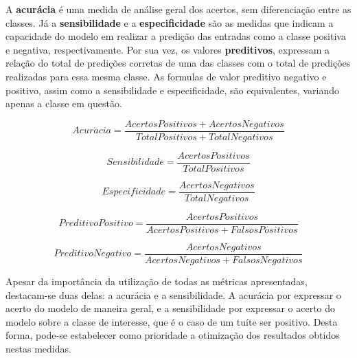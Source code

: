 \documentclass[oneside,openright,12pt]{ufsm_2015} %
\begin{document}
    \par A \textbf{acurácia} é uma medida de análise geral dos acertos, sem diferenciação entre as classes. Já a \textbf{sensibilidade} e a \textbf{especificidade} são as medidas que indicam a capacidade do modelo em realizar a predição das entradas como a classe positiva e negativa, respectivamente. Por sua vez, os valores \textbf{preditivos}, expressam a relação do total de predições corretas de uma das classes com o total de predições realizadas para essa mesma classe. As formulas de valor preditivo negativo e positivo, assim como a sensibilidade e especificidade, são equivalentes, variando apenas a classe em questão.
    
    \begin{equation} \label{eq:acuracidade}
    Acur\acute{a}cia = \frac{AcertosPositivos + AcertosNegativos}{TotalPositivos + TotalNegativos}
    \end{equation}
    
    \begin{equation} \label{eq:sensibilidade}
    Sensibilidade = \frac{AcertosPositivos}{TotalPositivos}
    \end{equation}
    
    \begin{equation} \label{eq:especificidade}
    Especificidade = \frac{AcertosNegativos}{TotalNegativos}
    \end{equation}
    
    \begin{equation} \label{eq:predit-pos}
    PreditivoPositivo = \frac{AcertosPositivos}{AcertosPositivos + FalsosPositivos}
    \end{equation}
    
    \begin{equation} \label{eq:predit-neg}
    PreditivoNegativo = \frac{AcertosNegativos}{AcertosNegativos + FalsosNegativos}
    \end{equation}
    
    \par Apesar da importância da utilização de todas as métricas apresentadas, destacam-se duas delas: a acurácia e a sensibilidade. A acurácia por expressar o acerto do modelo de maneira geral, e a sensibilidade por expressar o acerto do modelo sobre a classe de interesse, que é o caso de um tuíte ser positivo. Desta forma, pode-se estabelecer como prioridade a otimização dos resultados obtidos nestas medidas.
    
\end{document}
